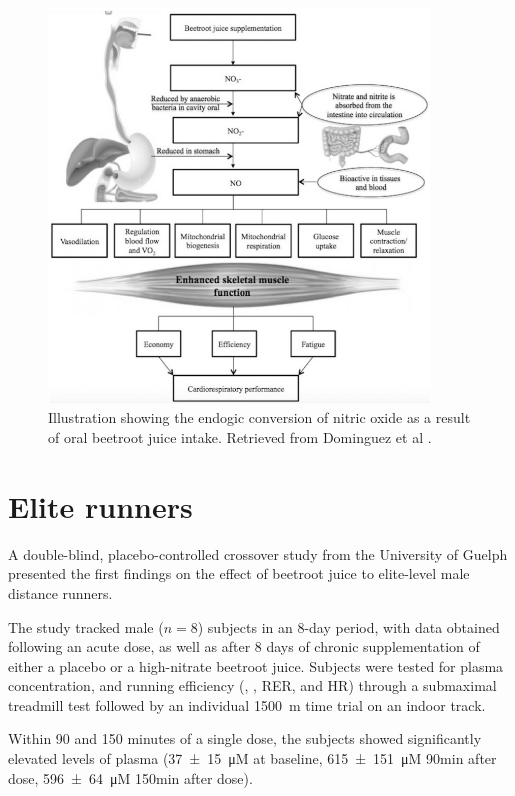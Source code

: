 \begin{figure}[h]
    \centering
    \includegraphics[width=0.9\textwidth]{assets/dominguezfigure.jpg}
    \caption{Illustration showing the endogic  conversion of nitric oxide as a result of oral beetroot juice intake. Retrieved from Dominguez et al \cite{dominguez2017effects}.}
    \label{fig:dominguez}
\end{figure}
\section{Elite runners}
A double-blind, placebo-controlled crossover study from the University of Guelph presented the first findings on the effect of beetroot juice to elite-level male distance runners\cite[56]{boorsma2013effect}.

The study tracked male ($n=8$) subjects in an 8-day period, with data obtained following an acute dose, as well as after 8 days of chronic supplementation of either a placebo or a high-nitrate beetroot juice. Subjects were tested for plasma \notm concentration, and running efficiency (\vot, \vcot, RER, and HR) through a submaximal treadmill test followed by an individual \SI{1500}{m} time trial on an indoor track\cite[40]{boorsma2013effect}.

Within 90 and 150 minutes of a single dose, the subjects showed significantly elevated levels of plasma \notm (\SI{37\pm15}{\micro M} at baseline, \SI{615\pm151}{\micro M} 90min after dose, \SI{596\pm64}{\micro M} 150min after dose). 

